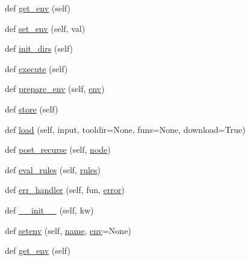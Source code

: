 \begin{DoxyCompactItemize}
def \hyperlink{classwaflib_1_1_configure_1_1_configuration_context_a5f2dfad34690147826b09413246140f7}{get\+\_\+env} (self)
\item 
def \hyperlink{classwaflib_1_1_configure_1_1_configuration_context_ad30b269279dd9c24e6d892bb3b2fc583}{set\+\_\+env} (self, val)
\item 
def \hyperlink{classwaflib_1_1_configure_1_1_configuration_context_a782925b68e221c10f8e08433329364c9}{init\+\_\+dirs} (self)
\item 
def \hyperlink{classwaflib_1_1_configure_1_1_configuration_context_a2dadcc441cc31bb49159c709bae0ec32}{execute} (self)
\item 
def \hyperlink{classwaflib_1_1_configure_1_1_configuration_context_a913063288a6135c3105acf180e7f0f0c}{prepare\+\_\+env} (self, \hyperlink{classwaflib_1_1_configure_1_1_configuration_context_a390267f6d3529fe07447ffb4925ca533}{env})
\item 
def \hyperlink{classwaflib_1_1_configure_1_1_configuration_context_aadaed27da973f44dde6eaa890026be35}{store} (self)
\item 
def \hyperlink{classwaflib_1_1_configure_1_1_configuration_context_ae13e6fac1db3060edb50337f97b7be3f}{load} (self, input, tooldir=None, funs=None, download=True)
\item 
def \hyperlink{classwaflib_1_1_configure_1_1_configuration_context_a9620736938604c56dc26964b06a24e2e}{post\+\_\+recurse} (self, \hyperlink{structnode}{node})
\item 
def \hyperlink{classwaflib_1_1_configure_1_1_configuration_context_af1b5fdd6d958f8b996dba916c44ec9fa}{eval\+\_\+rules} (self, \hyperlink{classwaflib_1_1_configure_1_1_configuration_context_a279ad5a7c2630c4416afc36cad85a2db}{rules})
\item 
def \hyperlink{classwaflib_1_1_configure_1_1_configuration_context_acc349b079382fdac3d626eb46bd54b7e}{err\+\_\+handler} (self, fun, \hyperlink{sndfile__save_8m_ada4b423bc19e6ff5c5b514e55f518a82}{error})
\item 
def \hyperlink{classwaflib_1_1_configure_1_1_configuration_context_a0f139855aa53920d6f30a05e10253ab0}{\+\_\+\+\_\+init\+\_\+\+\_\+} (self, kw)
\item 
def \hyperlink{classwaflib_1_1_configure_1_1_configuration_context_a2ed4960105cdf08c13cd178367ae1818}{setenv} (self, \hyperlink{lib_2expat_8h_a1b49b495b59f9e73205b69ad1a2965b0}{name}, \hyperlink{classwaflib_1_1_configure_1_1_configuration_context_a390267f6d3529fe07447ffb4925ca533}{env}=None)
\item 
def \hyperlink{classwaflib_1_1_configure_1_1_configuration_context_a5f2dfad34690147826b09413246140f7}{get\+\_\+env} (self)

\end{DoxyCompactItemize}
